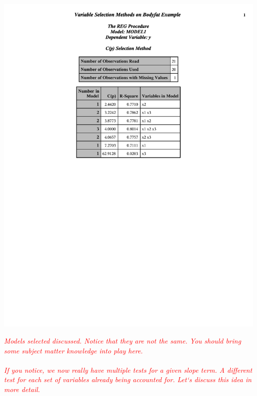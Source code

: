 \documentclass{article}
\begin{document}
\begin{center}
\begin{tabular}{cc}
\end{tabular}
\includegraphics[page=5,scale=0.6,trim=40mm 150mm 20mm 10mm]{bodyfatexampleselection}
\end{center}

\textit{\textcolor{red}{Models selected discussed.  Notice that they are not the same.  You should bring some subject matter knowledge into play here.\\~\\
If you notice, we now really have multiple tests for a given slope term.  A different test for each set of variables already being accounted for.  Let`s discuss this idea in more detail.}}\\~\\
\end{document}

